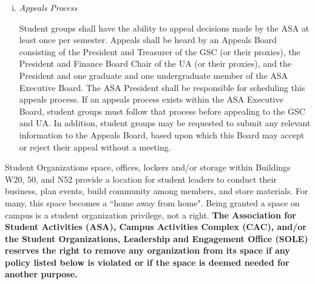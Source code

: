 \documentclass[12pt]{constitution}
\begin{document}
\begin{enumerate}[i.]
\item \textit{Appeals Process}

Student groups shall have the ability to appeal decisions made by the ASA at least once per semester.
Appeals shall be heard by an Appeals Board consisting of the President and Treasurer of the GSC
    (or their proxies), the President and Finance Board Chair of the UA (or their proxies),
    and the President and one graduate and one undergraduate member of the ASA Executive Board.
The ASA President shall be responsible for scheduling this appeals process.
If an appeals process exists within the ASA Executive Board, student groups must follow that process
    before appealing to the GSC and UA.
In addition, student groups may be requested to submit any relevant information to the Appeals Board,
    based upon which this Board may accept or reject their appeal without a meeting.
\end{enumerate}

Student Organizations space, offices, lockers and/or storage within Buildings W20, 50, and N52 provide
    a location for student leaders to conduct their business, plan events, build community among members,
    and store materials. For many, this space becomes a ``home away from home".
Being granted a space on campus is a student organization privilege, not a right.
\textbf{The Association for Student Activities (ASA), Campus Activities Complex (CAC), and/or the
    Student Organizations, Leadership and Engagement Office (SOLE) reserves the right to remove any
    organization from its space if any policy listed below is violated or if the space is deemed needed
    for another purpose.}

\let\sectionnumstyle\arabic
\end{document}

